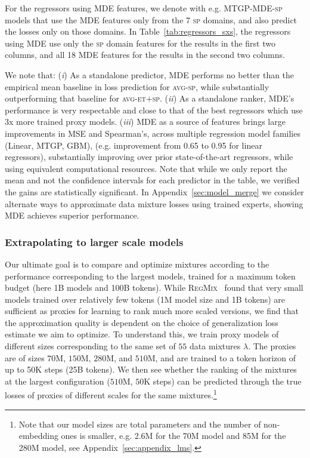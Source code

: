 For the regressors using MDE features, we denote with e.g. MTGP-\textsc{MDE-sp} models that use the MDE features only from the 7 \textsc{sp} domains, and also predict the losses only on those domains. In Table~\ref{tab:regressors_sxs}, the regressors using MDE use only the \textsc{sp} domain features for the results in the first two columns, and all 18 MDE features for the results in the second two columns. 

We note that: (\textit{i}) As a standalone predictor, MDE performs no better than the empirical mean baseline in loss prediction for \textsc{avg-sp}, while substantially outperforming that baseline for \textsc{avg-et+sp}. (\textit{ii}) As a standalone ranker, MDE's performance is very respectable and close to that of the best regressors which use 3x more trained proxy models. (\textit{iii}) MDE as a source of features brings large improvements in MSE and Spearman's, across multiple regression model families (Linear, MTGP, GBM), (e.g. improvement from 0.65 to 0.95 for linear regressors),  substantially improving over prior state-of-the-art regressors, while using equivalent computational resources. Note that while we only report the mean and not the confidence intervals for each predictor in the table, we verified the gains are statistically significant. In Appendix~\ref{sec:model_merge} we consider alternate ways to approximate data mixture losses using trained experts, showing MDE achieves superior performance.
    
   







\subsubsection*{Extrapolating to larger scale models}

Our ultimate goal is to compare and optimize mixtures according to the performance corresponding to the largest models, trained for a maximum token budget (here 1B models and 100B tokens). While \textsc{RegMix}~\citep{regmix} found that very small models trained over relatively few tokens (1M model size and 1B tokens) are sufficient as proxies for learning to rank much more scaled versions, we find that the approximation quality is dependent on the choice of generalization loss estimate we aim to optimize.  To understand this, we train proxy  models of different sizes corresponding to the same set of $55$ data mixtures $\lambda$. The proxies are of sizes $70$M, $150$M, $280$M, and $510$M, and are trained to a token horizon of up to 50K steps (25B tokens). We then see whether the ranking of the mixtures at the largest configuration ($510$M, $50$K steps) can be predicted through the true losses of proxies of different scales for the same mixtures.\footnote{Note that our model sizes are total parameters and the number of non-embedding ones is smaller, e.g. 2.6M for the 70M model and 85M for the 280M model, see Appendix~\ref{sec:appendix_lms}.}


